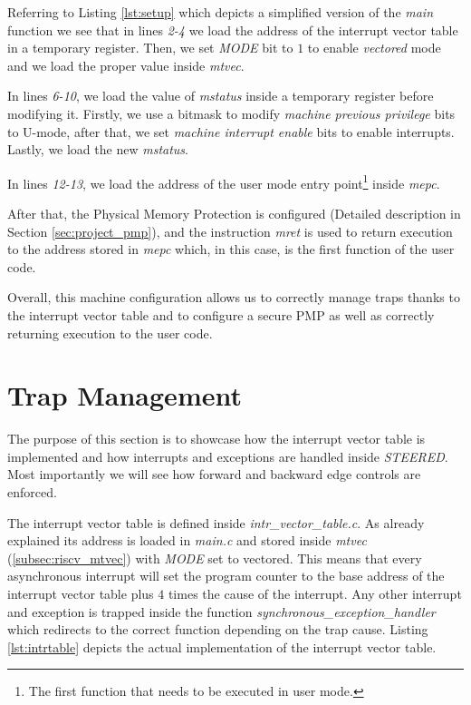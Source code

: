 Referring to Listing \ref{lst:setup} which depicts a simplified version of the
\textit{main} function we see that in lines \textit{2-4} we load the address of
the interrupt vector table in a temporary register. Then, we set \textit{MODE} bit
to $1$ to enable \textit{vectored} mode and we load the proper value inside
\textit{mtvec}.

In lines \textit{6-10}, we load the value of \textit{mstatus} inside a temporary
register before modifying it. Firstly, we use a bitmask to modify \textit{machine
previous privilege} bits to U-mode, after that, we set \textit{machine interrupt
enable} bits to enable interrupts. Lastly, we load the new \textit{mstatus}.

In lines \textit{12-13}, we load the address of the user mode entry point\footnote{The
first function that needs to be executed in user mode.} inside \textit{mepc}.

After that, the Physical Memory Protection is configured (Detailed description in
Section \ref{sec:project_pmp}), and the instruction \textit{mret} is used to
return execution to the address stored in \textit{mepc} which, in this case, is the
first function of the user code.

Overall, this machine configuration allows us to correctly manage traps thanks
to the interrupt vector table and to configure a secure PMP as well as correctly
returning execution to the user code.

\section{Trap Management}
\label{sec:project_isr}

The purpose of this section is to showcase how the interrupt vector table is implemented
and how interrupts and exceptions are handled inside \textit{STEERED}. Most importantly
we will see how forward and backward edge controls are enforced.

The interrupt vector table is defined inside \textit{intr\_vector\_table.c}. As already
explained its address is loaded in \textit{main.c} and stored inside \textit{mtvec}
(\ref{subsec:riscv_mtvec}) with \textit{MODE} set to vectored. This means that every
asynchronous interrupt will set the program counter to the base address of the interrupt
vector table plus $4$ times the cause of the interrupt. Any other interrupt and
exception is trapped inside the function \textit{synchronous\_exception\_handler}
which redirects to the correct function depending on the trap cause. Listing
\ref{lst:intrtable} depicts the actual implementation of the interrupt vector
table.

